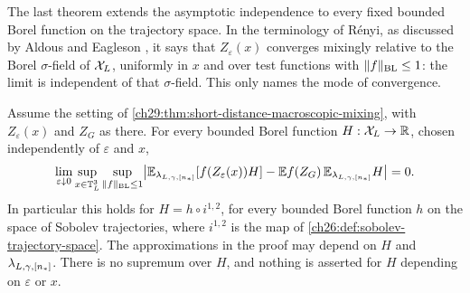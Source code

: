 The last theorem extends the asymptotic independence to every fixed bounded Borel function on the trajectory space. In the terminology of Rényi, as discussed by Aldous and Eagleson \cite{AldousEagleson1978}, it says that $Z_\varepsilon(x)$ converges mixingly relative to the Borel $\sigma$-field of $\mathcal X_L$, uniformly in $x$ and over test functions with $\|f\|_{\rm BL}\le1$: the limit is independent of that $\sigma$-field. This only names the mode of convergence.

\begin{theorem}\label{ch29:thm:short-distance-orbit-borel-mixing}
Assume the setting of \cref{ch29:thm:short-distance-macroscopic-mixing}, with $Z_\varepsilon(x)$ and $Z_G$ as there. For every bounded Borel function $H:\mathcal X_L\to\mathbb R$, chosen independently of $\varepsilon$ and $x$,
\[
 \lim_{\varepsilon\downarrow0}\sup_{x\in\mathbb T_L^3}\sup_{\|f\|_{\rm BL}\le1}\bigl|\mathbb E_{\lambda_{L,\gamma,[n_*]}}[f(Z_\varepsilon(x))H]-\mathbb E f(Z_G)\,\mathbb E_{\lambda_{L,\gamma,[n_*]}}H\bigr|=0.
\]
In particular this holds for $H=h\circ i^{1,2}$, for every bounded Borel function $h$ on the space of Sobolev trajectories, where $i^{1,2}$ is the map of \cref{ch26:def:sobolev-trajectory-space}. The approximations in the proof may depend on $H$ and $\lambda_{L,\gamma,[n_*]}$. There is no supremum over $H$, and nothing is asserted for $H$ depending on $\varepsilon$ or $x$.
\end{theorem}


